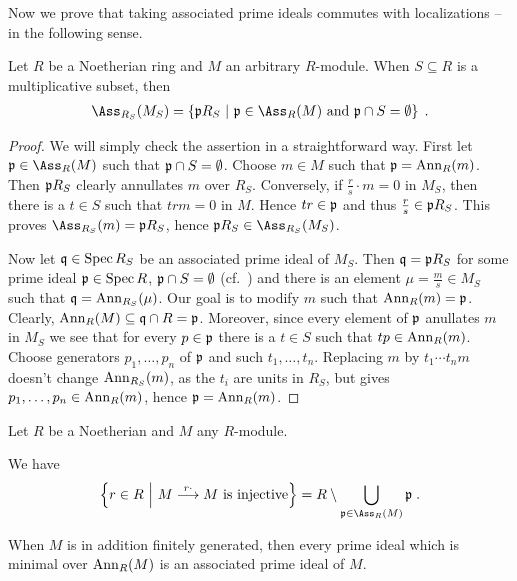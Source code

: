 \documentclass[a4paper,parskip=half,numbers=enddot, DIV=12]{scrreprt}
\begin{document}
Now we prove that taking associated prime ideals commutes with localizations -- in the following sense. 
\begin{prop}
	Let $R$ be a Noetherian ring and $M$ an arbitrary $R$-module. When $S\subseteq R$ is a multiplicative subset, then
	\begin{align*}
		\Ass_{R_S}(M_S)=\left\{\pp R_S\st \pp\in\Ass_R(M)\text{ and }\pp\cap S=\emptyset\right\}\;.
	\end{align*}
\end{prop}
\begin{proof}
	We will simply check the assertion in a straightforward way. First let $\pp\in\Ass_R(M)$ such that $\mathfrak{p}\cap S=\emptyset$. Choose $m\in M$ such that $\mathfrak{p}=\operatorname{Ann}_R(m)$. Then $\mathfrak{p} R_S$ clearly annullates $m$ over $R_S$. Conversely, if $\frac{r}{s}\cdot m=0$ in $M_S$, then there is a $t\in S$ such that $trm=0$ in $M$. Hence $tr\in\mathfrak{p}$ and thus $\frac{r}{s}\in\mathfrak{p} R_S$. This proves $\Ass_{R_S}(m)=\pp R_S$, hence $\pp R_S\in\Ass_{R_S}(M_S)$.
	
	Now let $\mathfrak{q}\in\operatorname{Spec} R_S$ be an associated prime ideal of $M_S$. Then $\mathfrak{q}=\mathfrak{p} R_S$ for some prime ideal $\mathfrak{p}\in\operatorname{Spec} R$, $\mathfrak{p}\cap S=\emptyset$ (cf.\ \cite[Corollary~2.3.1]{alg1}) and there is an element $\mu=\frac{m}{s}\in M_S$ such that $\mathfrak{q}=\operatorname{Ann}_{R_S}(\mu)$. Our goal is to modify $m$ such that $\operatorname{Ann}_R(m)=\mathfrak{p}$. Clearly, $\operatorname{Ann}_R(M)\subseteq \mathfrak{q}\cap R=\mathfrak{p}$. Moreover, since every element of $\mathfrak{p}$ anullates $m$ in $M_S$ we see that for every $p\in\mathfrak{p}$ there is a $t\in S$ such that $tp\in\operatorname{Ann}_R(m)$. Choose generators $p_1,\ldots,p_n$ of $\mathfrak{p}$ and such $t_1,\ldots,t_n$. Replacing $m$ by $t_1\cdots t_nm$ doesn't change $\operatorname{Ann}_{R_S}(m)$, as the $t_i$ are units in $R_S$, but gives $p_1,\ldots,p_n\in\operatorname{Ann}_R(m)$, hence $\mathfrak{p}=\operatorname{Ann}_R(m)$.
\end{proof}
\begin{prop}
	Let $R$ be a Noetherian and $M$ any $R$-module.
	\begin{alphanumerate}
		\item We have
		\begin{align*}
			\left\{r\in R\st M\morphism[r\cdot ]M\text{ is injective}\right\}=R\setminus\bigcup_{\pp\in \Ass_R(M)}\pp\;.
		\end{align*}
		\item When $M$ is in addition finitely generated, then every prime ideal which is minimal over $\operatorname{Ann}_R(M)$ is an associated prime ideal of $M$.
	\end{alphanumerate}
\end{prop}
\end{document}
